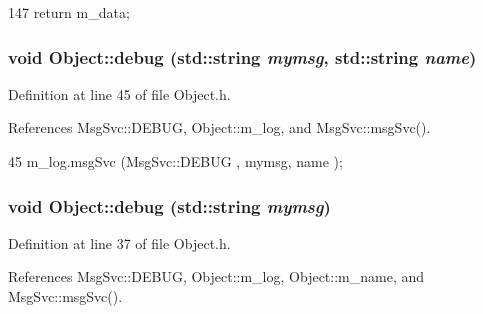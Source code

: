 \begin{DoxyCode}
147 { return m_data; }
\end{DoxyCode}
\hypertarget{classObject_a6c9a0397ca804e04d675ed05683f5420}{
\subsubsection[{debug}]{\setlength{\rightskip}{0pt plus 5cm}void Object::debug (std::string {\em mymsg}, \/  std::string {\em name})}}
\label{classObject_a6c9a0397ca804e04d675ed05683f5420}


Definition at line 45 of file Object.h.

References MsgSvc::DEBUG, Object::m\_\-log, and MsgSvc::msgSvc().


\begin{DoxyCode}
45 { m_log.msgSvc (MsgSvc::DEBUG   , mymsg, name ); }
\end{DoxyCode}
\hypertarget{classObject_aac010553f022165573714b7014a15f0d}{
\subsubsection[{debug}]{\setlength{\rightskip}{0pt plus 5cm}void Object::debug (std::string {\em mymsg})}}
\label{classObject_aac010553f022165573714b7014a15f0d}


Definition at line 37 of file Object.h.

References MsgSvc::DEBUG, Object::m\_\-log, Object::m\_\-name, and MsgSvc::msgSvc().

